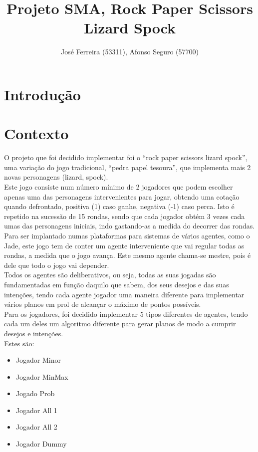 \documentclass[12pt]{article}
\title{Projeto SMA, Rock Paper Scissors Lizard Spock}
\author{José Ferreira (53311), Afonso Seguro (57700)}
\begin{document}
	
	\maketitle
	
	\section*{Introdução}
	
	\newpage
	\section*{Contexto}
	O projeto que foi decidido implementar foi o “rock paper scissors lizard spock”, uma variação do jogo tradicional, “pedra papel tesoura”, que implementa mais 2 novas personagens (lizard, spock).\\
    Este jogo consiste num número mínimo de 2 jogadores que podem escolher apenas uma das personagens intervenientes para jogar, obtendo uma cotação quando defrontado, positiva (1) caso ganhe, negativa (-1) caso perca. Isto é repetido na sucessão de 15 rondas, sendo que cada jogador obtém 3 vezes cada umas das personagens iniciais, indo gastando-as a medida do decorrer das rondas.\\
    Para ser implantado numas plataformas para sistemas de vários agentes, como o Jade, este jogo tem de conter um agente interveniente que vai regular todas as rondas, a medida que o jogo avança. Este mesmo agente chama-se mestre, pois é dele que todo o jogo vai depender.\\
    Todos os agentes são deliberativos, ou seja, todas as suas jogadas são fundamentadas em função daquilo que sabem, dos seus desejos e das suas intenções, tendo cada agente jogador uma maneira diferente para implementar vários planos em prol de alcançar o máximo de pontos possíveis.\\
    Para os jogadores, foi decidido implementar 5 tipos diferentes de agentes, tendo cada um deles um algoritmo diferente para gerar planos de modo a cumprir desejos e intenções.\\
    
    Estes são:

    \begin{itemize}
        \item Jogador Minor
        \item Jogador MinMax
        \item Jogado Prob
        \item Jogador All 1
        \item Jogador All 2
        \item Jogador Dummy
    \end{itemize}
\end{document}
